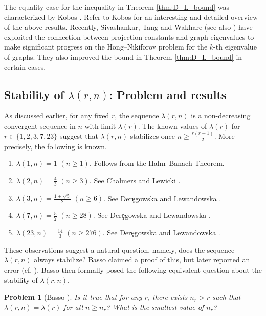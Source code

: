 \documentclass[11pt]{article}
\theoremstyle{plain}
\newtheorem{problem}[theorem]{Problem}
\numberwithin{equation}{section}
\begin{document}
The equality case for the inequality in Theorem \ref{thm:D_L_bound} was characterized by Kobos \cite{Kobos_2025}. Refer to Kobos \cite{Kobos_2025} for an interesting and detailed overview of the above results. Recently, Sivashankar, Tang and Wakhare \cite{Sivashankar_Tang_Wakhare_2026} (see also \cite{Kumar_Mohar_Mojallal_Pragada_2026}) have exploited the connection between projection constants and graph eigenvalues to make significant progress on the Hong--Nikiforov problem for the $k$-th eigenvalue of graphs. They also improved the bound in Theorem \ref{thm:D_L_bound} in certain cases.  

\subsection{Stability of $\lambda(r,n)$: Problem and results}

As discussed earlier, for any fixed $r$, the sequence $\lambda(r,n)$ is a non-decreasing convergent sequence in $n$ with limit $\lambda(r)$. The known values of $\lambda(r)$ for $r\in \{1,2,3,7, 23\}$ suggest that $\lambda(r,n)$ stabilizes once $n\ge \frac{r(r+1)}{2}$. More precisely, the following is known.
\begin{enumerate}[$(i)$]
   
    \item $\lambda(1,n) = 1$ $(n\ge 1)$. Follows from the Hahn--Banach Theorem.
    \item $\lambda(2,n) = \frac{4}{3}$ $(n\ge 3)$. See Chalmers and Lewicki \cite{Chalmers_Lewicki_2010}.
    \item $\lambda(3,n) = \frac{1+\sqrt{5}}{2}$ $(n\ge 6)$. See Der\c{e}gowska and Lewandowska \cite{Deregowska_Lewandowska_2023}. 
    \item $\lambda(7,n) = \frac{5}{2}$ $(n\ge 28)$. See Der\c{e}gowska and Lewandowska \cite{Deregowska_Lewandowska_2023}.
    \item $\lambda(23, n) = \frac{14}{3}$ $(n\ge 276)$. See Der\c{e}gowska and Lewandowska \cite{Deregowska_Lewandowska_2023}.
\end{enumerate}
 
These observations suggest a natural question, namely, does the sequence $\lambda(r,n)$ always stabilize? Basso \cite{Basso_2019} claimed a proof of this, but later reported an error \cite{Basso_2024_corrigendum} (cf. \cite{Kobos_2025}). Basso \cite{Basso_2024_corrigendum} then formally posed the following equivalent question about the stability of $\lambda(r,n)$.

\begin{problem}[Basso {\cite[Question A]{Basso_2024_corrigendum}}] Is it true that for any $r$, there exists $n_r > r$ such that $\lambda(r,n) = \lambda(r)$ for all $n\ge n_r$? What is the smallest value of $n_r$?
\end{problem}
\end{document}
